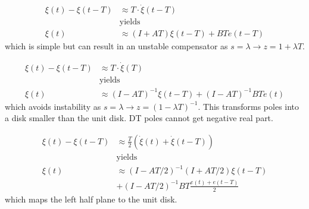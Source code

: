 \noindent\begin{align*}
    \xi(t)-\xi(t-T) & \approx T\cdot\dot{\xi}(t-T)   \\
                    & \text{yields}                  \\
    \xi(t)          & \approx(I+AT)\xi(t-T)+BTe(t-T)
\end{align*}
which is simple but can result in an unstable compensator as $s=\lambda \rightarrow z=1+\lambda T$.\\
%

\noindent\begin{align*}
    \xi(t)-\xi(t-T) & \approx T\cdot\dot{\xi}(T)                   \\
                    & \text{yields}                                \\
    \xi(t)          & \approx(I-AT)^{-1}\xi(t-T)+(I-AT)^{-1}BTe(t)
\end{align*}
which avoids instability as $s=\lambda \rightarrow z=(1-\lambda T)^{-1}$. This transforms poles into a disk smaller than the unit disk. DT poles cannot get negative real part.\\

\noindent\begin{align*}
    \xi(t)-\xi(t-T) & \approx \frac T2\left(\dot{\xi}(t)+\dot{\xi}(t-T)\right) \\
                    & \text{yields}                                            \\
    \xi(t)          & \approx(I-AT/2)^{-1}(I+AT/2)\xi(t-T)                     \\
                    & +(I-AT/2)^{-1}BT\frac{e(t)+e(t-T)}2
\end{align*}
which maps the left half plane to the unit disk.